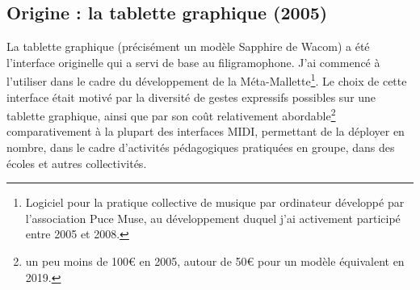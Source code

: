 \subsection{Origine : la tablette graphique (2005)}
\label{sec:interfaces:phylogenese:wacom}

\noindent La tablette graphique (précisément un modèle Sapphire de Wacom) a été l’interface originelle qui a servi de base au filigramophone. J’ai commencé à l’utiliser dans le cadre du développement de la Méta-Mallette\footnote{Logiciel pour la pratique collective de musique par ordinateur développé par l’association Puce Muse, au développement duquel j'ai activement participé entre 2005 et 2008.}. Le choix de cette interface était motivé par la diversité de gestes expressifs possibles sur une tablette graphique, ainsi que par son coût relativement abordable\footnote{un peu moins de 100€ en 2005, autour de 50€ pour un modèle équivalent en 2019.} comparativement à la plupart des interfaces \gls{MIDI}, permettant de la déployer en nombre, dans le cadre d'activités pédagogiques pratiquées en groupe, dans des écoles et autres collectivités.\\
